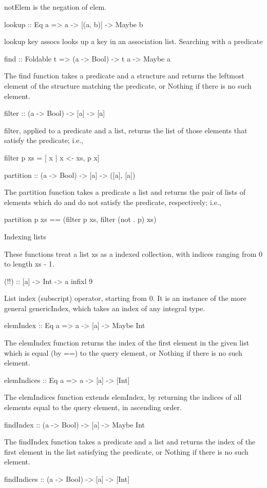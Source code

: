 notElem is the negation of elem.

lookup :: Eq a => a -> [(a, b)] -> Maybe b

lookup key assocs looks up a key in an association list.
Searching with a predicate

find :: Foldable t => (a -> Bool) -> t a -> Maybe a

The find function takes a predicate and a structure and returns the leftmost element of the structure matching the predicate, or Nothing if there is no such element.

filter :: (a -> Bool) -> [a] -> [a]

filter, applied to a predicate and a list, returns the list of those elements that satisfy the predicate; i.e.,

filter p xs = [ x | x <- xs, p x]

partition :: (a -> Bool) -> [a] -> ([a], [a])

The partition function takes a predicate a list and returns the pair of lists of elements which do and do not satisfy the predicate, respectively; i.e.,

partition p xs == (filter p xs, filter (not . p) xs)

Indexing lists

These functions treat a list xs as a indexed collection, with indices ranging from 0 to length xs - 1.

(!!) :: [a] -> Int -> a infixl 9

List index (subscript) operator, starting from 0. It is an instance of the more general genericIndex, which takes an index of any integral type.

elemIndex :: Eq a => a -> [a] -> Maybe Int

The elemIndex function returns the index of the first element in the given list which is equal (by ==) to the query element, or Nothing if there is no such element.

elemIndices :: Eq a => a -> [a] -> [Int]

The elemIndices function extends elemIndex, by returning the indices of all elements equal to the query element, in ascending order.

findIndex :: (a -> Bool) -> [a] -> Maybe Int

The findIndex function takes a predicate and a list and returns the index of the first element in the list satisfying the predicate, or Nothing if there is no such element.

findIndices :: (a -> Bool) -> [a] -> [Int]

